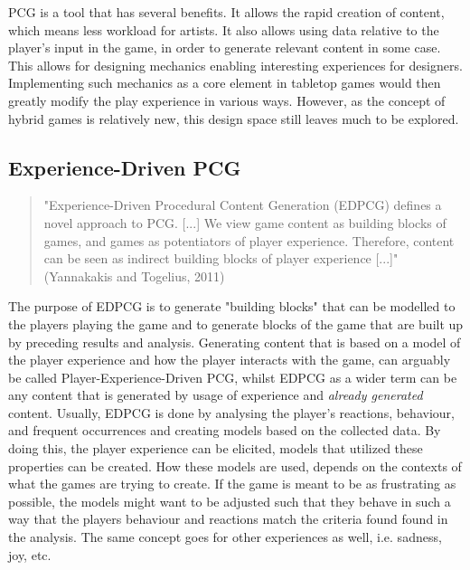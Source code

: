 PCG is a tool that has several benefits. It allows the rapid creation of content, which means less workload for artists. It also allows using data relative to the player's input in the game, in order to generate relevant content in some case. This allows for designing mechanics enabling interesting experiences for designers. Implementing such mechanics as a core element in tabletop games would then greatly modify the play experience in various ways. However, as the concept of hybrid games is relatively new, this design space still leaves much to be explored.

\subsection{Experience-Driven PCG}
\begin{quotation} 
"Experience-Driven Procedural Content Generation (EDPCG) defines a novel approach to PCG. [...] We view game content as building blocks of games, and games as potentiators of player experience. Therefore, content can be seen as indirect building blocks of player experience [...]" (Yannakakis and Togelius, 2011) \cite{art:edpcg}
\end{quotation}

The purpose of EDPCG is to generate "building blocks" that can be modelled to the players playing the game and to generate blocks of the game that are built up by preceding results and analysis. Generating content that is based on a model of the player experience and how the player interacts with the game, can arguably be called Player-Experience-Driven PCG, whilst EDPCG as a wider term can be any content that is generated by usage of experience and \textit{already generated} content. Usually, EDPCG is done by analysing the player's reactions, behaviour, and frequent occurrences and creating models based on the collected data. By doing this, the player experience can be elicited, models that utilized these properties can be created. How these models are used, depends on the contexts of what the games are trying to create. If the game is meant to be as frustrating as possible, the models might want to be adjusted such that they behave in such a way that the players behaviour and reactions match the criteria found found in the analysis. The same concept goes for other experiences as well, i.e. sadness, joy, etc.

